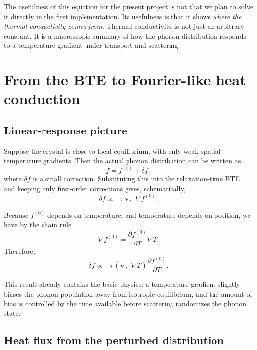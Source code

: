 \documentclass[11pt]{article}
\newcommand{\vvg}{\mathbf{v}_g}
\begin{document}
The usefulness of this equation for the present project is not that we plan to solve it directly in the first implementation. Its usefulness is that it shows \emph{where the thermal conductivity comes from}. Thermal conductivity is not just an arbitrary constant. It is a macroscopic summary of how the phonon distribution responds to a temperature gradient under transport and scattering.

\section{From the BTE to Fourier-like heat conduction}

\subsection{Linear-response picture}

Suppose the crystal is close to local equilibrium, with only weak spatial temperature gradients. Then the actual phonon distribution can be written as
\begin{equation}
 f = f^{(0)} + \delta f,
\end{equation}
where $\delta f$ is a small correction. Substituting this into the relaxation-time BTE and keeping only first-order corrections gives, schematically,
\begin{equation}
 \delta f \propto -\tau\, \vvg\cdot \nabla f^{(0)}.
\end{equation}

Because $f^{(0)}$ depends on temperature, and temperature depends on position, we have by the chain rule
\begin{equation}
\nabla f^{(0)} = \frac{\partial f^{(0)}}{\partial T}\nabla T.
\end{equation}
Therefore,
\begin{equation}
 \delta f \propto -\tau\, (\vvg\cdot \nabla T)\frac{\partial f^{(0)}}{\partial T}.
\end{equation}

This result already contains the basic physics: a temperature gradient slightly biases the phonon population away from isotropic equilibrium, and the amount of bias is controlled by the time available before scattering randomizes the phonon state.

\subsection{Heat flux from the perturbed distribution}
\end{document}
